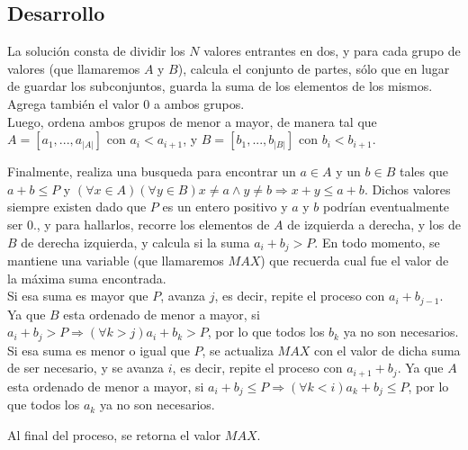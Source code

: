 \subsection{Desarrollo}
La solución consta de dividir los $N$ valores entrantes en dos, y para cada grupo de valores (que llamaremos $A$ y $B$), calcula el conjunto de partes, sólo que en lugar de guardar los subconjuntos, guarda la suma de los elementos de los mismos. Agrega también el valor $0$ a ambos grupos.\\
Luego, ordena ambos grupos de menor a mayor, de manera tal que $A = [a_{1},...,a_{\vert A\vert}]$ con $a_{i} < a_{i+1}$, y $B = [b_{1},...,b_{\vert B\vert}]$ con $b_{i} < b_{i+1}$.\par
Finalmente, realiza una busqueda para encontrar un $a \in A$ y un $b \in B$ tales que $a + b \leq P$ y $(\forall x \in A)(\forall y \in B) x \neq a \wedge y \neq b \Rightarrow x + y \leq a + b$. Dichos valores siempre existen dado que $P$ es un entero positivo y $a$ y $b$ podrían eventualmente ser $0$., y para hallarlos, recorre los elementos de $A$ de izquierda a derecha, y los de $B$ de derecha izquierda, y calcula si la suma $a_{i} + b_{j} > P$. En todo momento, se mantiene una variable (que llamaremos $MAX$) que recuerda cual fue el valor de la máxima suma encontrada.\\
Si esa suma es mayor que $P$, avanza $j$, es decir, repite el proceso con $a_{i} + b_{j-1}$. Ya que $B$ esta ordenado de menor a mayor, si $a_{i} + b_{j} > P \Rightarrow (\forall k > j) a_{i}+b_{k} > P$, por lo que todos los $b_{k}$ ya no son necesarios.\\
Si esa suma es menor o igual que $P$, se actualiza $MAX$ con el valor de dicha suma de ser necesario, y se avanza $i$, es decir, repite el proceso con $a_{i+1} + b_{j}$. Ya que $A$ esta ordenado de menor a mayor, si $a_{i} + b_{j} \leq P \Rightarrow (\forall k < i) a_{k}+b_{j} \leq P$, por lo que todos los $a_{k}$ ya no son necesarios.\par
Al final del proceso, se retorna el valor $MAX$.
